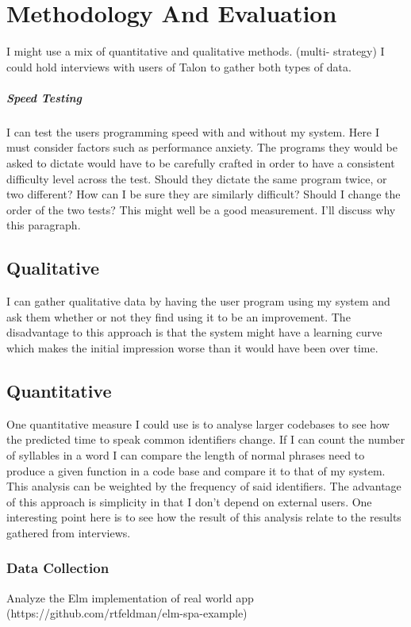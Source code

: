 \documentclass[../thesis.tex]{subfiles}
\begin{document}
\chapter{Methodology And Evaluation}\label{methodology_and_evaluation}
I might use a mix of quantitative and qualitative methods. (multi- strategy) %
I could hold interviews with users of Talon to gather both types of data.

\paragraph{Speed Testing}
I can test the users programming speed with and without my system.
Here I must consider factors such as performance anxiety.
The programs they would be asked to dictate would have to be carefully crafted in order to have a consistent difficulty level
across the test. 
Should they dictate the same program twice, or two different? How can I be sure they are similarly difficult?
Should I change the order of the two tests?
This might well be a good measurement. I'll discuss why this paragraph.


\section{Qualitative}
I can gather qualitative data by having the user program using my system and ask them whether or not they find using it to be an improvement.
The disadvantage to this approach is that the system might have a learning curve which makes the initial impression
worse than it would have been over time.

\section{Quantitative}
One quantitative measure I could use is to analyse larger codebases to see how the predicted time to speak common identifiers change.
If I can count the number of syllables in a word I can compare the length of normal phrases need to produce a given function in a code base and compare
it to that of my system. This analysis can be weighted by the frequency of said identifiers.
The advantage of this approach is simplicity in that I don't depend on external users.
One interesting point here is to see how the result of this analysis relate to the results gathered from interviews.
\subsection{Data Collection}
Analyze the Elm implementation of real world app (https://github.com/rtfeldman/elm-spa-example)
\end{document}
